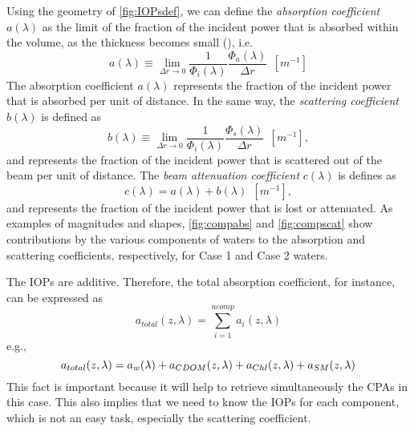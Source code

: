 Using the geometry of \autoref{fig:IOPsdef}, we can define the {\it absorption coefficient}  $a(\lambda)$ as the limit of the fraction of the incident power that is absorbed within the volume, as the thickness becomes small (\cite{Mobley:2001}), i.e.
\begin{equation}
  a(\lambda)\equiv \lim_{\Delta r\to 0} \frac{1}{\Phi_i(\lambda)}\frac{\Phi_a(\lambda)}{\Delta r}~~\left[m^{-1} \right]
\end{equation}
The absorption coefficient $a(\lambda)$ represents the fraction of the incident power that is absorbed per unit of distance. In the same way, the {\it scattering coefficient}  $b(\lambda)$ is defined as
\begin{equation}
  b(\lambda)\equiv \lim_{\Delta r\to 0} \frac{1}{\Phi_i(\lambda)}\frac{\Phi_s(\lambda)}{\Delta r}~~\left[m^{-1} \right],
\end{equation}
and represents the fraction of the incident power that is scattered out of the beam per unit of distance. The {\it beam attenuation coefficient}  $c(\lambda)$ is defines as
\begin{equation}
  c(\lambda)=a(\lambda)+b(\lambda)~~\left[m^{-1} \right],
\end{equation}
and represents the fraction of the incident power that is lost or attenuated. As examples of magnitudes and shapes, \autoref{fig:compabs} and \autoref{fig:compscat} show contributions by the various components of waters to the absorption and scattering coefficients, respectively, for Case 1 and Case 2 waters.

The IOPs are additive. Therefore, the total absorption coefficient, for instance, can be expressed as
\begin{equation}
  a_{total}(z,\lambda) = \sum_{i=1}^{ncomp} a_i(z,\lambda)
\end{equation}
e.g.,
\begin{equation}
  a_{total}(z,\lambda) =  a_w(\lambda) +a_{CDOM}(z,\lambda)+ a_{Chl}(z,\lambda)+a_{SM}(z,\lambda) \notag
\end{equation}
This fact is important because it will help to retrieve simultaneously the CPAs in this case. This also implies that we need to know the IOPs for each component, which is not an easy task, especially the scattering coefficient.

